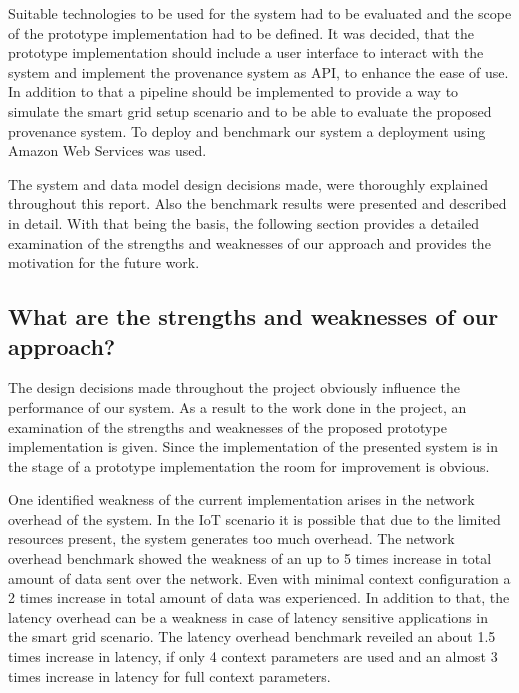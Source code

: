 Suitable technologies to be used for the system had to be evaluated and the scope of the prototype implementation had to be defined. It was decided, that the prototype implementation should include a user interface to interact with the system and implement the provenance system as API, to enhance the ease of use. In addition to that a pipeline should be implemented to provide a way to simulate the smart grid setup scenario and to be able to evaluate the proposed provenance system. To deploy and benchmark our system a deployment using Amazon Web Services was used. 

The system and data model design decisions made, were thoroughly explained throughout this report. Also the benchmark results were presented and described in detail. With that being the basis, the following section provides a detailed examination of the strengths and weaknesses of our approach and provides the motivation for the future work.
\subsection{What are the strengths and weaknesses of our approach?}
The design decisions made throughout the project obviously influence the performance of our system. As a result to the work done in the project, an examination of the strengths and weaknesses of the proposed prototype implementation is given. 
Since the implementation of the presented system is in the stage of a prototype implementation the room for improvement is obvious.

One identified weakness of the current implementation arises in the network overhead of the system. In the IoT scenario it is possible that due to the limited resources present, the system generates too much overhead. The network overhead benchmark showed the weakness of an up to 5 times increase in total amount of data sent over the network. Even with minimal context configuration a 2 times increase in total amount of data was experienced.
In addition to that, the latency overhead can be a weakness in case of latency sensitive applications in the smart grid scenario. The latency overhead benchmark reveiled an about 1.5 times increase in latency, if only 4 context parameters are used and an almost 3 times increase in latency for full context parameters.

